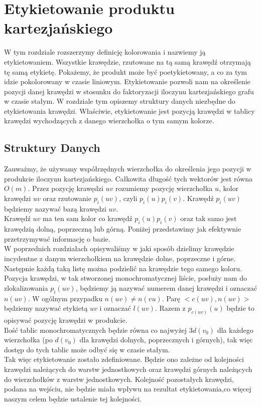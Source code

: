 \documentclass[12pt,a4paper,titlepage]{article}
\begin{document}
\section{Etykietowanie produktu kartezjańskiego}
W tym rozdziale rozszerzymy definicję kolorowania i nazwiemy ją etykietowaniem. Wszystkie krawędzie, rzutowane na tą samą krawędź otrzymają tę samą etykietę. Pokażemy, że produkt może być poetykietowany, a co za tym idzie pokolorowany w czasie liniowym. Etykietowanie pozwoli nam na określenie pozycji danej krawędzi w stosunku do faktoryzacji iloczynu kartezjańskiego grafu w czasie stałym. W rozdziale tym opiszemy struktury danych niezbędne do etykietowania krawędzi. Właściwie, etykietowanie jest pozycją krawędzi w tablicy krawędzi wychodzących z danego wierzchołka o tym samym kolorze. \\
\subsection{Struktury Danych}
Zauważmy, że używamy współrzędnych wierzchołka do określenia jego pozycji w produkcie iloczynu kartezjańskiego. Całkowita długość tych wektorów jest równa $O(m)$. Przez pozycję krawędzi $uv$ rozumiemy pozycję wierzchołka $u$, kolor krawędzi $uv$ oraz rzutowanie $p_i (uv)$, czyli $p_i(u) p_i(v)$. Krawędź $p_i (uv)$ będziemy nazywać bazą krawędzi $uv$. \\
Krawędź $uv$ ma ten sam kolor co krawędź $p_i (u)p_i(v)$ oraz tak samo jest krawędzią dolną, poprzeczną lub górną. Poniżej przedstawimy jak efektywnie przetrzymywać informację o bazie. \\
W poprzednich rozdziałach opisywaliśmy w jaki sposób dzielimy krawędzie incydentne z danym wierzchołkiem na krawędzie dolne, poprzeczne i górne. Następnie każdą taką listę można podzielić na krawędzie tego samego koloru. Pozycja krawędzi, w tak stworzonej monochromatycznej liście, posłuży nam do zlokalizowania $p_i(uv)$, będziemy ją nazywać numerem danej krawędzi i oznaczać $n(uv)$. W ogólnym przypadku $n(uv) \neq n(vu)$. Parę $<c(uv), n(uv)>$ będziemy nazywać etykietą $uv$ i oznaczać $l(uv)$. Razem z $p_{c(uv)}(u)$ będzie to opisywać pozycję krawędzi w produkcie. \\
Ilość tablic monochromatycznych będzie równa co najwyżej $3d(v_0 )$ dla każdego wierzchołka (po $d(v_0)$ dla krawędzi dolnych, poprzecznych i górnych), tak więc dostęp do tych tablic może odbyć się w czasie stałym.\\
Tak więc etykietowanie zostało zdefiniowane. Będzie ono zależne od kolejności krawędzi należących do warstw jednostkowych oraz krawędzi górnych należących do wierzchołków z warstw jednostkowych. Kolejność pozostałych krawędzi, podana na wejściu, nie będzie miała wpływu na rezultat etykietowania,co więcej naszym celem będzie ustalenie tej kolejności. \\
\end{document}
